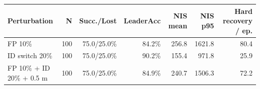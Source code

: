\begin{tabular}{lrrrrrr}
\toprule
\textbf{Perturbation} & \textbf{N} & \textbf{Succ./Lost} & \textbf{LeaderAcc} & \textbf{NIS mean} & \textbf{NIS p95} & \textbf{Hard recovery / ep.} \\
\midrule
FP 10\% & 100 & 75.0/25.0\% & 84.2\% & 256.8 & 1621.8 & 80.4 \\
ID switch 20\% & 100 & 75.0/25.0\% & 90.2\% & 155.4 & 971.8 & 25.9 \\
FP 10\% + ID 20\% + 0.5 m & 100 & 75.0/25.0\% & 84.9\% & 240.7 & 1506.3 & 72.2 \\
\bottomrule
\end{tabular}
